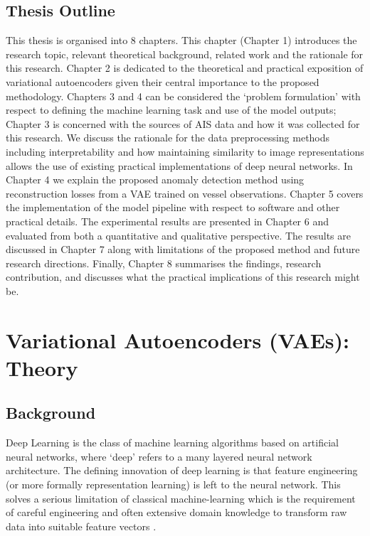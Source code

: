 \documentclass{mldsmsc}
\begin{document}
\section{Thesis Outline}
This thesis is organised into 8 chapters. This chapter (Chapter  1)  introduces the research topic, relevant theoretical background, related work and the rationale for this research. Chapter 2 is dedicated to the theoretical and practical exposition of variational autoencoders given their central importance to the proposed methodology. Chapters 3 and 4 can be considered the `problem formulation' with respect to defining the machine learning task and use of the model outputs; Chapter 3 is concerned with the sources of AIS data and how it was collected for this research. We discuss the rationale for the data preprocessing methods including interpretability and how maintaining similarity to image representations allows the use of existing practical implementations of deep neural networks. In Chapter 4 we explain the proposed anomaly detection method using reconstruction losses from a VAE trained on vessel observations.  Chapter 5 covers the implementation of the model pipeline with respect to software and other practical details. The experimental results are presented in Chapter 6 and evaluated from both a quantitative and qualitative perspective.  The results are discussed in Chapter 7 along with limitations of the proposed method and future research directions. Finally, Chapter 8 summarises the findings, research contribution, and discusses what the practical implications of this research might be. 


\chapter{Variational Autoencoders (VAEs): Theory}\label{sec:VAE_theory}
\section{Background}\label{sec:VAE_background}
Deep Learning is the class of machine learning algorithms based on artificial neural networks, where ‘deep’ refers to a many layered neural network architecture. The defining innovation of deep learning is that feature engineering (or more formally representation learning) is left to the neural network. This solves a serious limitation of classical machine-learning which is the requirement of careful engineering and often extensive domain knowledge to transform raw data into suitable feature vectors \citep{lecun_deep_2015}.
\end{document}
